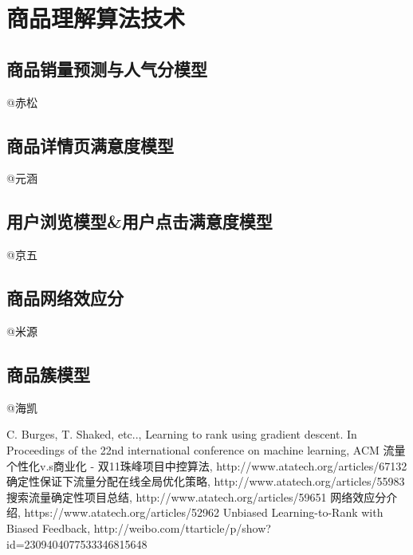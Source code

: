 
\chapter{ 商品理解算法技术 }
\thispagestyle{empty}

\setlength{\fboxrule}{0pt}\setlength{\fboxsep}{0cm}
\noindent\shadowbox{
\begin{tcolorbox}[arc=0mm,colback=lightblue,colframe=darkblue,title=学习目标与要求]

\end{tcolorbox}}
\setlength{\fboxrule}{1pt}\setlength{\fboxsep}{4pt} 

\section{商品销量预测与人气分模型 }
	@赤松
\section{商品详情页满意度模型} 
	@元涵

\section{用户浏览模型\&用户点击满意度模型}  
	@京五
\section{商品网络效应分}
	@米源
\section{商品簇模型} 
	@海凯

\begin{thebibliography}{99}
 C. Burges, T. Shaked, etc.., Learning to rank 
using gradient descent. In Proceedings of the 22nd international 
conference on machine learning, ACM
 流量个性化v.s商业化 - 双11珠峰项目中控算法, http://www.atatech.org/articles/67132
 确定性保证下流量分配在线全局优化策略, http://www.atatech.org/articles/55983
 搜索流量确定性项目总结, http://www.atatech.org/articles/59651
 网络效应分介绍, https://www.atatech.org/articles/52962
 Unbiased Learning-to-Rank with Biased Feedback, http://weibo.com/ttarticle/p/show?id=2309404077533346815648
\end{thebibliography}

 

